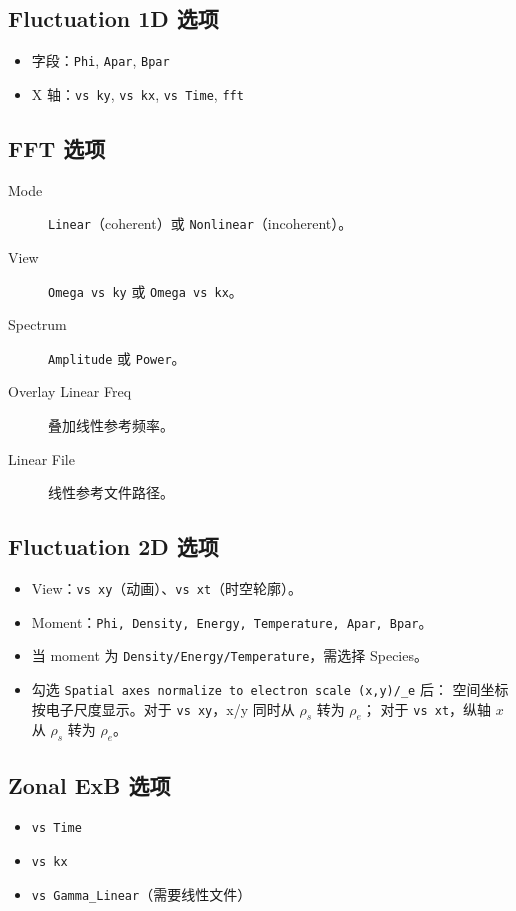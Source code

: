 \documentclass[11pt,a4paper]{ctexart}
\begin{document}
\subsection{Fluctuation 1D 选项}
\begin{itemize}
  \item 字段：\texttt{Phi}, \texttt{Apar}, \texttt{Bpar}
  \item X 轴：\texttt{vs ky}, \texttt{vs kx}, \texttt{vs Time}, \texttt{fft}
\end{itemize}

\subsection{FFT 选项}
\begin{description}
  \item[Mode] \texttt{Linear}（coherent）或 \texttt{Nonlinear}（incoherent）。
  \item[View] \texttt{Omega vs ky} 或 \texttt{Omega vs kx}。
  \item[Spectrum] \texttt{Amplitude} 或 \texttt{Power}。
  \item[Overlay Linear Freq] 叠加线性参考频率。
  \item[Linear File] 线性参考文件路径。
\end{description}

\subsection{Fluctuation 2D 选项}
\begin{itemize}
  \item View：\texttt{vs xy}（动画）、\texttt{vs xt}（时空轮廓）。
  \item Moment：\texttt{Phi, Density, Energy, Temperature, Apar, Bpar}。
  \item 当 moment 为 \texttt{Density/Energy/Temperature}，需选择 Species。
  \item 勾选 \texttt{Spatial axes normalize to electron scale (x,y)/\rho_e} 后：
  空间坐标按电子尺度显示。对于 \texttt{vs xy}，x/y 同时从 $\rho_s$ 转为 $\rho_e$；
  对于 \texttt{vs xt}，纵轴 $x$ 从 $\rho_s$ 转为 $\rho_e$。
\end{itemize}

\subsection{Zonal ExB 选项}
\begin{itemize}
  \item \texttt{vs Time}
  \item \texttt{vs kx}
  \item \texttt{vs Gamma\_Linear}（需要线性文件）
\end{itemize}
\end{document}
